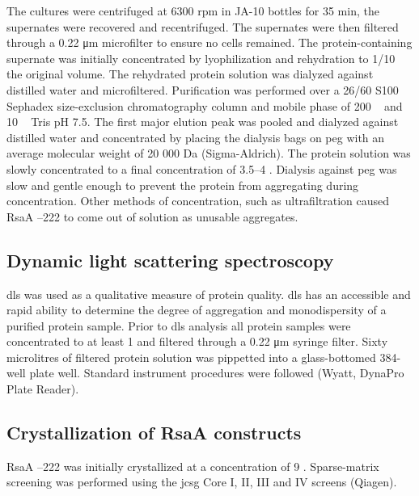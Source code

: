 The cultures were centrifuged at 6300 rpm in JA-10 bottles for
35 min, the supernates were recovered and recentrifuged. The
supernates were then filtered through a 0.22 \si{\micro\meter} microfilter to ensure
no cells remained. The protein-containing supernate was initially
concentrated by lyophilization and rehydration to 1/10 the original
volume. The rehydrated protein solution was dialyzed against distilled
water and microfiltered. Purification was performed over a 26/60 S100
Sephadex size-exclusion chromatography column and mobile phase of 200 \si{\milli\molar}  and 10 \si{\milli\molar}
Tris pH 7.5. The first major elution peak was pooled and dialyzed
against distilled water and concentrated by placing the dialysis bags on
\ac{peg} with an average molecular weight of 20 000 Da (Sigma-Aldrich). The protein
solution was slowly concentrated to a final concentration of 3.5--4
\mgperml. Dialysis against \ac{peg} was slow and gentle enough to prevent the
protein from aggregating during concentration. Other methods of concentration,
such as ultrafiltration caused RsaA --222 to come out of solution as unusable aggregates.


\subsection{Dynamic light scattering spectroscopy}\label{dls}

\Ac{dls} was used as a qualitative measure of protein quality. \Ac{dls}  has an
accessible and rapid ability to determine the degree of aggregation and
monodispersity of a purified protein sample. Prior to \ac{dls} analysis all
protein samples were concentrated to at least 1 \mgperml and filtered through a
0.22 \si{\micro\meter} syringe filter. Sixty microlitres of filtered protein solution was pippetted into a glass-bottomed 384-well plate well. Standard instrument procedures were followed (Wyatt, DynaPro Plate Reader\texttrademark{}). 

\subsection{Crystallization of RsaA constructs}\label{crystallization}

 RsaA  --222 was initially crystallized at a concentration of 9 \mgperml. Sparse-matrix screening was performed using the \ac{jcsg} Core I, II, III and IV screens (Qiagen). 

